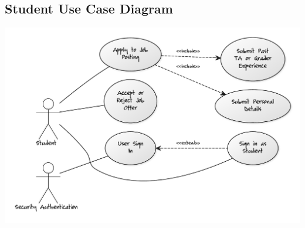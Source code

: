 \documentclass[12pt]{report}
\begin{document}
\subsection{Student Use Case Diagram}
\includegraphics[scale=0.5]{model/Diagrams/UC/studentUC}
\end{document}
